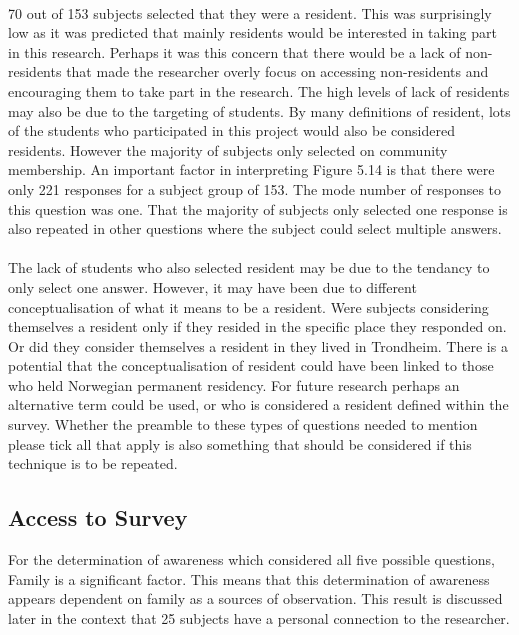 \paragraph{}
70 out of 153 subjects selected that they were a resident. This was surprisingly low as it was predicted that mainly residents would be interested in taking part in this research. Perhaps it was this concern that there would be a lack of non-residents that made the researcher overly focus on accessing non-residents and encouraging them to take part in the research. The high levels of lack of residents may also be due to the targeting of students. By many definitions of resident, lots of the students who participated in this project would also be considered residents. However the majority of subjects only selected on community membership. An important factor in interpreting Figure 5.14 is that there were only 221 responses for a subject group of 153. The mode number of responses to this question was one. That the majority of subjects only selected one response is also repeated in other questions where the subject could select multiple answers. 
\paragraph{}
The lack of students who also selected resident may be due to the tendancy to only select one answer. However, it may have been due to different conceptualisation of what it means to be a resident. Were subjects considering themselves a resident only if they resided in the specific place they responded on. Or did they consider themselves a resident in they lived in Trondheim. There is a potential that the conceptualisation of resident could have been linked to those who held Norwegian permanent residency. For future research perhaps an alternative term could be used, or who is considered a resident defined within the survey. Whether the preamble to these types of questions needed to mention please tick all that apply is also something that should be considered if this technique is to be repeated. 
\paragraph{}

\subsection{Access to Survey}

For the determination of awareness which considered all five possible questions, Family is a significant factor. This means that this determination of awareness appears dependent on family as a sources of observation. This result is discussed later in the context that 25 subjects have a personal connection to the researcher.

